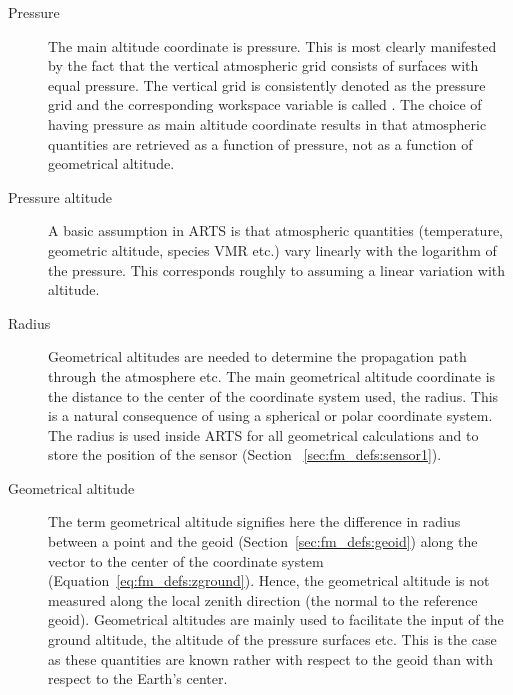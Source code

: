 \begin{description}
  
\item[Pressure] The main altitude coordinate is
  pressure. This is most clearly manifested by the fact that the
  vertical atmospheric grid consists of surfaces with equal pressure.
  The vertical grid is consistently denoted as the pressure grid and
  the corresponding workspace variable is called . The
  choice of having pressure as main altitude coordinate results in
  that atmospheric quantities are retrieved as a function of pressure,
  not as a function of geometrical altitude.
  
\item[Pressure altitude] A basic assumption
  in ARTS is that atmospheric quantities (temperature, geometric
  altitude, species VMR etc.) vary linearly with the logarithm of the
  pressure. This corresponds roughly to assuming a linear variation
  with altitude. 
  
\item[Radius] Geometrical altitudes are
  needed to determine the propagation path through the atmosphere etc.
  The main geometrical altitude coordinate is the distance to the
  center of the coordinate system used, the radius. This is a natural
  consequence of using a spherical or polar coordinate system. The
  radius is used inside ARTS for all geometrical calculations and to
  store the position of the sensor (Section~
  \ref{sec:fm_defs:sensor1}).
  
\item[Geometrical altitude] The term
  geometrical altitude signifies here the difference in radius between
  a point and the geoid (Section~\ref{sec:fm_defs:geoid}) along the
  vector to the center of the coordinate system
  (Equation~\ref{eq:fm_defs:zground}). Hence, the geometrical altitude
  is not measured along the local zenith direction (the normal to the
  reference geoid). Geometrical altitudes are mainly used to
  facilitate the input of the ground altitude, the altitude of the
  pressure surfaces etc. This is the case as these quantities are known
  rather with respect to the geoid than with respect to the Earth's
  center.

\end{description}


